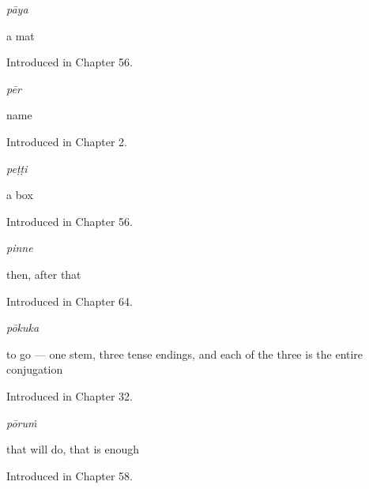 \noindent\begin{minipage}[t]{\linewidth}
\raggedright
\textbf{}\enspace\emph{pāya}\par
\small a mat\par
\footnotesize Introduced in Chapter 56.
\end{minipage}\par\medskip

\noindent\begin{minipage}[t]{\linewidth}
\raggedright
\textbf{}\enspace\emph{pēr}\par
\small name\par
\footnotesize Introduced in Chapter 2.
\end{minipage}\par\medskip

\noindent\begin{minipage}[t]{\linewidth}
\raggedright
\textbf{}\enspace\emph{peṭṭi}\par
\small a box\par
\footnotesize Introduced in Chapter 56.
\end{minipage}\par\medskip

\noindent\begin{minipage}[t]{\linewidth}
\raggedright
\textbf{}\enspace\emph{pinne}\par
\small then, after that\par
\footnotesize Introduced in Chapter 64.
\end{minipage}\par\medskip

\noindent\begin{minipage}[t]{\linewidth}
\raggedright
\textbf{}\enspace\emph{pōkuka}\par
\small to go — one stem, three tense endings, and each of the three is the entire conjugation\par
\footnotesize Introduced in Chapter 32.
\end{minipage}\par\medskip

\noindent\begin{minipage}[t]{\linewidth}
\raggedright
\textbf{}\enspace\emph{pōruṁ}\par
\small that will do, that is enough\par
\footnotesize Introduced in Chapter 58.
\end{minipage}\par\medskip


